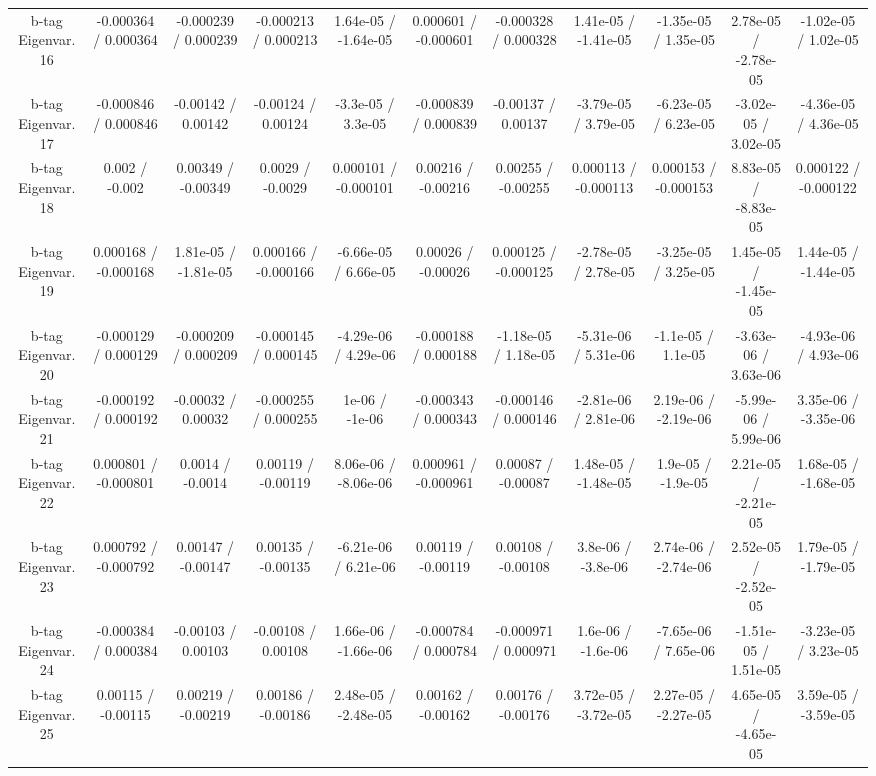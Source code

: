 \begin{table}[htbp]
\begin{center}
\begin{tabular}{|c|c|c|c|c|c|c|c|c|c|c|}
  b-tag Eigenvar. 16 & -0.000364 / 0.000364 & -0.000239 / 0.000239 & -0.000213 / 0.000213 & 1.64e-05 / -1.64e-05 & 0.000601 / -0.000601 & -0.000328 / 0.000328 & 1.41e-05 / -1.41e-05 & -1.35e-05 / 1.35e-05 & 2.78e-05 / -2.78e-05 & -1.02e-05 / 1.02e-05 \\ 
  b-tag Eigenvar. 17 & -0.000846 / 0.000846 & -0.00142 / 0.00142 & -0.00124 / 0.00124 & -3.3e-05 / 3.3e-05 & -0.000839 / 0.000839 & -0.00137 / 0.00137 & -3.79e-05 / 3.79e-05 & -6.23e-05 / 6.23e-05 & -3.02e-05 / 3.02e-05 & -4.36e-05 / 4.36e-05 \\ 
  b-tag Eigenvar. 18 & 0.002 / -0.002 & 0.00349 / -0.00349 & 0.0029 / -0.0029 & 0.000101 / -0.000101 & 0.00216 / -0.00216 & 0.00255 / -0.00255 & 0.000113 / -0.000113 & 0.000153 / -0.000153 & 8.83e-05 / -8.83e-05 & 0.000122 / -0.000122 \\ 
  b-tag Eigenvar. 19 & 0.000168 / -0.000168 & 1.81e-05 / -1.81e-05 & 0.000166 / -0.000166 & -6.66e-05 / 6.66e-05 & 0.00026 / -0.00026 & 0.000125 / -0.000125 & -2.78e-05 / 2.78e-05 & -3.25e-05 / 3.25e-05 & 1.45e-05 / -1.45e-05 & 1.44e-05 / -1.44e-05 \\ 
  b-tag Eigenvar. 20 & -0.000129 / 0.000129 & -0.000209 / 0.000209 & -0.000145 / 0.000145 & -4.29e-06 / 4.29e-06 & -0.000188 / 0.000188 & -1.18e-05 / 1.18e-05 & -5.31e-06 / 5.31e-06 & -1.1e-05 / 1.1e-05 & -3.63e-06 / 3.63e-06 & -4.93e-06 / 4.93e-06 \\ 
  b-tag Eigenvar. 21 & -0.000192 / 0.000192 & -0.00032 / 0.00032 & -0.000255 / 0.000255 & 1e-06 / -1e-06 & -0.000343 / 0.000343 & -0.000146 / 0.000146 & -2.81e-06 / 2.81e-06 & 2.19e-06 / -2.19e-06 & -5.99e-06 / 5.99e-06 & 3.35e-06 / -3.35e-06 \\ 
  b-tag Eigenvar. 22 & 0.000801 / -0.000801 & 0.0014 / -0.0014 & 0.00119 / -0.00119 & 8.06e-06 / -8.06e-06 & 0.000961 / -0.000961 & 0.00087 / -0.00087 & 1.48e-05 / -1.48e-05 & 1.9e-05 / -1.9e-05 & 2.21e-05 / -2.21e-05 & 1.68e-05 / -1.68e-05 \\ 
  b-tag Eigenvar. 23 & 0.000792 / -0.000792 & 0.00147 / -0.00147 & 0.00135 / -0.00135 & -6.21e-06 / 6.21e-06 & 0.00119 / -0.00119 & 0.00108 / -0.00108 & 3.8e-06 / -3.8e-06 & 2.74e-06 / -2.74e-06 & 2.52e-05 / -2.52e-05 & 1.79e-05 / -1.79e-05 \\ 
  b-tag Eigenvar. 24 & -0.000384 / 0.000384 & -0.00103 / 0.00103 & -0.00108 / 0.00108 & 1.66e-06 / -1.66e-06 & -0.000784 / 0.000784 & -0.000971 / 0.000971 & 1.6e-06 / -1.6e-06 & -7.65e-06 / 7.65e-06 & -1.51e-05 / 1.51e-05 & -3.23e-05 / 3.23e-05 \\ 
  b-tag Eigenvar. 25 & 0.00115 / -0.00115 & 0.00219 / -0.00219 & 0.00186 / -0.00186 & 2.48e-05 / -2.48e-05 & 0.00162 / -0.00162 & 0.00176 / -0.00176 & 3.72e-05 / -3.72e-05 & 2.27e-05 / -2.27e-05 & 4.65e-05 / -4.65e-05 & 3.59e-05 / -3.59e-05 \\ 

\end{tabular}
\end{center}
\end{table}
